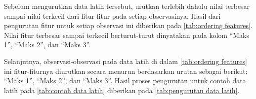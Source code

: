 \begin{contoh}
\noindent Sebelum mengurutkan data latih tersebut, urutkan terlebih dahulu nilai terbesar sampai nilai terkecil dari fitur-fitur pada setiap observasinya. Hasil dari pengurutan fitur untuk setiap observasi ini diberikan pada \ref{tab:ordering features}. Nilai fitur terbesar sampai terkecil berturut-turut dinyatakan pada kolom ``Maks 1'', ``Maks 2'', dan ``Maks 3''.
\begin{table}[ht!]
    \centering 
    \caption{Hasil pengurutan fitur untuk masing-masing observasi}
    \label{tab:ordering features}
\end{table}

\noindent Selanjutnya, observasi-observasi pada data latih di dalam \ref{tab:ordering features} ini fitur-fiturnya diurutkan secara menurun berdasarkan urutan sebagai berikut: ``Maks 1'', ``Maks 2'', dan ``Maks 3''. Hasil proses pengurutan untuk contoh data latih pada \ref{tab:contoh data latih} diberikan pada \ref{tab:pengurutan data latih}.


\end{contoh}
